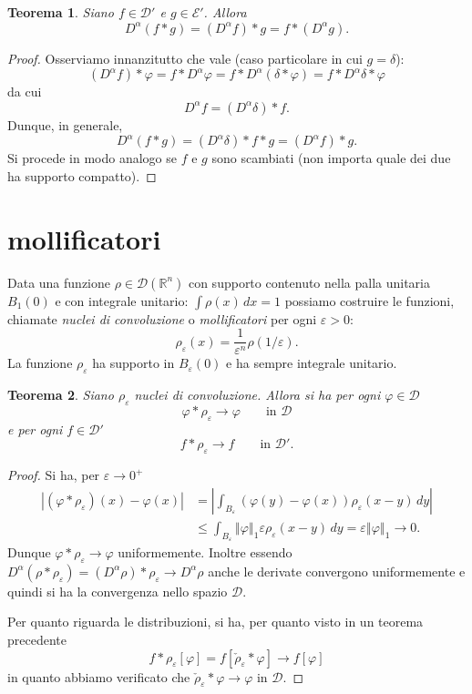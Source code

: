 \documentclass[italian,a4paper,oneside,headinclude]{scrbook}
\newcommand{\eps}{\varepsilon}
\renewcommand{\phi}{\varphi}
\newcommand{\D}{\mathcal D}
\newcommand{\E}{\mathcal E}
\newcommand{\RR}{\mathbb R}
\newcommand{\abs}[1]{{\left|#1\right|}}
\newcommand{\Abs}[1]{{\left\Vert #1\right\Vert}}
\newtheorem{theorem}{Teorema}
\begin{document}
\begin{theorem}
  Siano $f\in \D'$ e $g\in \E'$. Allora
  \[
   D^\alpha(f*g) = (D^\alpha f) * g = f * (D^\alpha g).
   \]
\end{theorem}
%
\begin{proof}
  Osserviamo innanzitutto che vale (caso particolare in cui $g=\delta$):
  \[
  (D^\alpha f) * \phi = f * D^\alpha \phi = f * D^\alpha(\delta * \phi)
  = f * D^\alpha \delta * \phi
  \]
  da cui
  \[
  D^\alpha f = (D^\alpha \delta) * f.
  \]
  Dunque, in generale,
  \[
  D^\alpha (f*g) = (D^\alpha \delta) * f * g
  = (D^\alpha f) * g.
  \]
  Si procede in modo analogo se  $f$ e $g$ sono scambiati (non importa
  quale dei due ha supporto compatto).
\end{proof}

\section{mollificatori}

Data una funzione $\rho\in \D(\RR^n)$ con supporto contenuto nella palla
unitaria $B_1(0)$ e con integrale unitario: $\int \rho(x)\, dx = 1$
possiamo costruire le funzioni, chiamate
\emph{nuclei di convoluzione} o \emph{mollificatori}
per ogni $\eps>0$:
\[
\rho_\eps(x) = \frac{1}{\eps^n}\rho(1/\eps).
\]
La funzione $\rho_\eps$ ha supporto in $B_\eps(0)$ e ha sempre
integrale unitario.

\begin{theorem}\label{th:mollificazione}
  Siano $\rho_\eps$ nuclei di convoluzione. Allora si ha
  per ogni $\phi \in \D$
  \[
  \phi * \rho_\eps \to \phi\qquad \text{in $\D$}
  \]
  e per ogni $f\in \D'$
  \[
    f * \rho_\eps \to f \qquad \text{in $\D'$}.
  \]
\end{theorem}
\begin{proof}
  Si ha, per $\eps\to 0^+$
  \begin{align*}
    \abs{(\phi*\rho_\eps)(x)-\phi(x)}
    &= \abs{\int_{B_\eps} (\phi(y)  - \phi(x)) \rho_\eps(x-y)\, dy} \\
    &\le \int_{B_\eps} \Abs{\phi}_1 \eps \rho_\eps(x-y)\, dy
    = \eps \Abs{\phi}_1 \to 0.
  \end{align*}
  Dunque $\phi * \rho_\eps \to \phi$ uniformemente. Inoltre essendo
  $D^\alpha(\rho * \rho_\eps) = (D^\alpha \rho) * \rho_\eps \to D^\alpha \rho$
  anche le derivate convergono uniformemente e quindi si ha la
  convergenza nello spazio $\D$.

  Per quanto riguarda le distribuzioni, si ha, per quanto visto in un
  teorema precedente
  \[
  f*\rho_\eps[\phi] = f[\check \rho_\eps * \phi]
  \to f[\phi]
  \]
  in quanto abbiamo verificato che $\check\rho_\eps * \phi \to \phi$
  in $\D$.
\end{proof}
\end{document}
